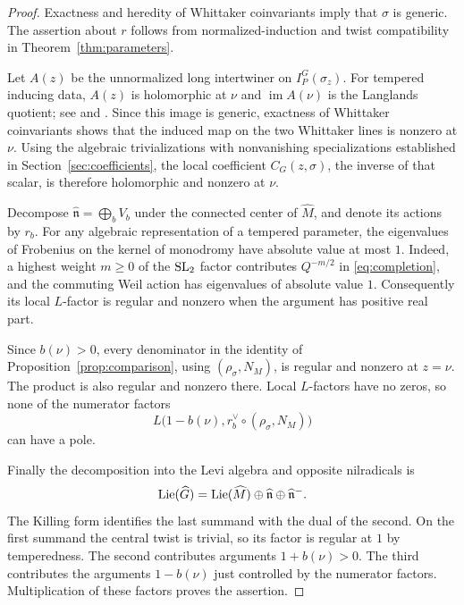 \begin{proof}
Exactness and heredity of Whittaker coinvariants imply that $\sigma$
is generic. The assertion about $r$ follows from normalized-induction
and twist compatibility in Theorem~\ref{thm:parameters}.

Let $A(z)$ be the unnormalized long intertwiner on
$I_P^G(\sigma_z)$. For tempered inducing data, $A(z)$ is holomorphic
at $\nu$ and $\operatorname{im}A(\nu)$ is the Langlands quotient;
see \cite[Lemme~VII.4.1 and Th\'eor\`eme~VII.4.2]{Renard}
and \cite[Section~2.2]{DCHL}. Since this image is generic, exactness of
Whittaker coinvariants shows that the induced map on the two Whittaker
lines is nonzero at $\nu$. Using the algebraic trivializations with
nonvanishing specializations established in Section~\ref{sec:coefficients},
the local coefficient $C_G(z,\sigma)$, the inverse of that scalar,
is therefore holomorphic and nonzero at $\nu$.

Decompose $\widehat{\mathfrak n}=\bigoplus_bV_b$ under the connected
center of $\widehat M$, and denote its actions by $r_b$. For any
algebraic representation of a tempered parameter, the eigenvalues of
Frobenius on the kernel of monodromy have absolute value at most $1$.
Indeed, a highest weight $m\geq0$ of the $\mathrm{SL}_2$ factor contributes
$Q^{-m/2}$ in \eqref{eq:completion}, and the commuting Weil action
has eigenvalues of absolute value $1$. Consequently its local
$L$-factor is regular and nonzero when the argument has positive real part.

Since $b(\nu)>0$, every denominator in the identity of
Proposition~\ref{prop:comparison}, using $(\rho_\sigma,N_M)$, is
regular and nonzero at $z=\nu$. The product is also regular and
nonzero there. Local $L$-factors have no zeros, so none of the numerator
factors
\[
 L\bigl(1-b(\nu),r_b^\vee\circ(\rho_\sigma,N_M)\bigr)
\]
can have a pole.

Finally the decomposition into the Levi algebra and opposite nilradicals is
\[
 \operatorname{Lie}(\widehat G)=\operatorname{Lie}(\widehat M)
                   \oplus\widehat{\mathfrak n}
                   \oplus\widehat{\mathfrak n}^{-}.
\]
The Killing form identifies the last summand with the dual of the second.
On the first summand the central twist is trivial, so its factor is
regular at $1$ by temperedness. The second contributes arguments
$1+b(\nu)>0$. The third contributes the arguments $1-b(\nu)$ just
controlled by the numerator factors. Multiplication of these factors
proves the assertion.
\end{proof}

